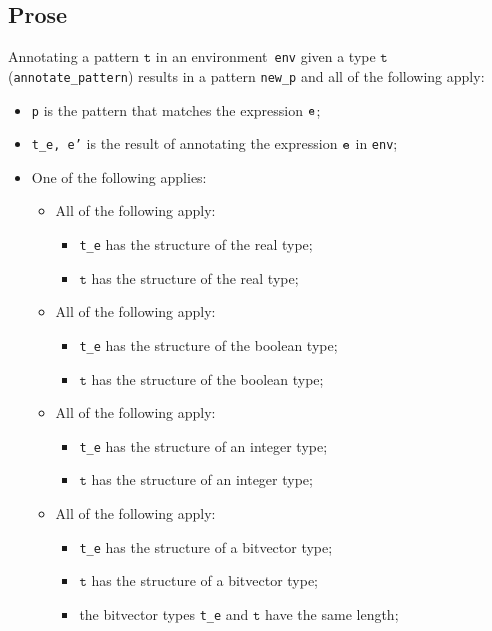 \documentclass{book}
\newcommand\vt[0]{\texttt{t}}
\begin{document}
\begin{itemize}
    \subsection{Prose}
      Annotating a pattern $\vt$ in an environment~\texttt{env} given a type $\vt$ (\texttt{annotate\_pattern}) results in a pattern \texttt{new\_p} and all of the following apply:
      \begin{itemize}
        \item \texttt{p} is the pattern that matches the expression $\texttt{e}$;
        \item \texttt{t\_e, e'} is the result of annotating the expression $\texttt{e}$ in \texttt{env};
        \item One of the following applies:
          \begin{itemize}
            \item All of the following apply:
              \begin{itemize}
                \item \texttt{t\_e} has the structure of the real type;
                \item $\vt$ has the structure of the real type;
              \end{itemize}
            \item All of the following apply:
              \begin{itemize}
                \item \texttt{t\_e} has the structure of the boolean type;
                \item $\vt$ has the structure of the boolean type;
              \end{itemize}
            \item All of the following apply:
              \begin{itemize}
                \item \texttt{t\_e} has the structure of an integer type;
                \item $\vt$ has the structure of an integer type;
              \end{itemize}
            \item All of the following apply:
              \begin{itemize}
                \item \texttt{t\_e} has the structure of a bitvector type;
                \item $\vt$ has the structure of a bitvector type;
                \item the bitvector types \texttt{t\_e} and $\vt$ have the same length;

\end{itemize}
\end{itemize}
\end{itemize}
\end{itemize}
\end{document}
